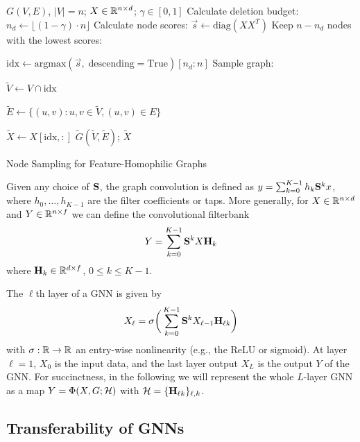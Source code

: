\documentclass[conference]{IEEEtran}
\theoremstyle{definition}
\begin{document}
\begin{algorithm}[t]
\begin{algorithmic}
    \Require $G(V, E)$, $|V|=n$; $X \in {\mathbb R}^{n \times d}$; $\gamma \in [0,1]$
    \vspace{2pt}
    \State Calculate deletion budget: $n_d \gets \lfloor (1 - \gamma) \cdot n \rfloor$
    \State Calculate node scores: $\Vec{s} \gets \text{diag}(XX^T)$
    \State Keep $n-n_d$ nodes with the lowest scores:
    
    $\text{idx} \gets \text{argmax}(\Vec{s}, \;\text{descending}=\text{True})[n_d:n]$
    \State Sample graph:
    
    $\tilde{V} \gets V \cap \text{idx}$
    
    $\tilde{E} \gets \{(u,v): u,v \in \tilde{V}, (u,v) \in E \}$
    
    $\tilde{X} \gets X[\text{idx},:]$
    \vspace{2pt}
    \State \Return $\tilde{G}(\tilde{V}, \tilde{E})$; $\tilde{X}$
\end{algorithmic}
\label{alg:sampling}
\caption{Node Sampling for Feature-Homophilic Graphs}
\end{algorithm}

Given any choice of ${\mathbf S}$, the graph convolution is defined as $y = \sum_{k=0}^{K-1} h_k {\mathbf S}^k x$, where $h_0, \ldots, h_{K-1}$ are the filter coefficients or taps. More generally, for $X \in {\mathbb R}^{n \times d}$ and $Y \in {\mathbb R}^{n\times f}$ we can define the convolutional filterbank \cite{gama18-gnnarchit}
\begin{equation}
     Y = \sum_{k=0}^{K-1} {\mathbf S}^k X {\mathbf H}_k
\end{equation}
where ${\mathbf H}_k \in {\mathbb R}^{d \times f}$, $0 \leq k \leq K-1$.

The $\ell$th layer of a GNN is given by \cite{gama18-gnnarchit}
\begin{equation}
    X_{\ell} = \sigma \bigg( \sum_{k=0}^{K-1} {\mathbf S}^k X_{\ell-1} {\mathbf H}_{\ell k}\bigg)
\end{equation}
with $\sigma: {\mathbb R} \to {\mathbb R}$ an entry-wise nonlinearity (e.g., the ReLU or sigmoid). At layer $\ell=1$, $X_0$ is the input data, and the last layer output $X_L$ is the output $Y$ of the GNN. For succinctness, in the following we will represent the whole $L$-layer GNN as a map $Y = \Phi(X,G;{\mathcal H})$ with ${\mathcal H}=\{{\mathbf H}_{\ell k}\}_{\ell,k}$.

\subsection{Transferability of GNNs}
\end{document}
